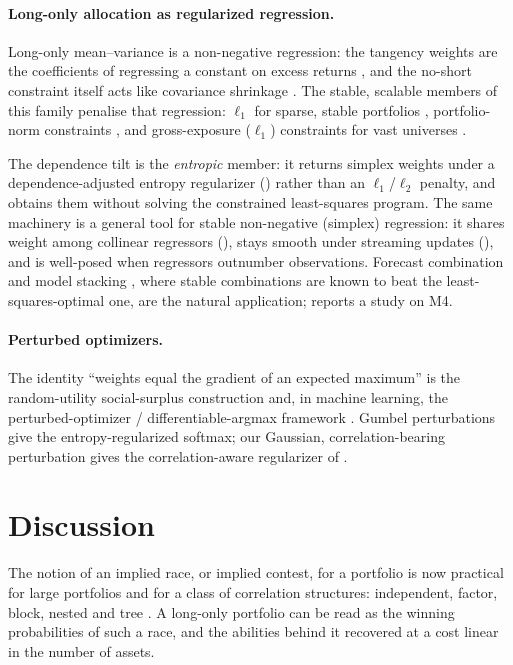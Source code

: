 \paragraph{Long-only allocation as regularized regression.}
Long-only mean--variance is a non-negative regression: the tangency weights are the
coefficients of regressing a constant on excess returns \parencite{brittenjones1999},
and the no-short constraint itself acts like covariance shrinkage
\parencite{jagannathanma2003}.
The stable, scalable members of this family penalise
that regression: $\ell_1$ for sparse, stable portfolios \parencite{brodie2009},
portfolio-norm constraints \parencite{demiguel2009norms}, and gross-exposure
($\ell_1$) constraints for vast universes \parencite{fan2012}.

The dependence tilt is
the \emph{entropic} member: it returns simplex weights under a dependence-adjusted
entropy regularizer () rather than an $\ell_1$/$\ell_2$ penalty,
and obtains them without solving the constrained least-squares program.
The same
machinery is a general tool for stable non-negative (simplex) regression: it shares
weight among collinear regressors (), stays smooth under
streaming updates (), and is well-posed when regressors outnumber
observations.
Forecast combination and model stacking \parencite{breiman1996,
timmermann2006}, where stable combinations are known to beat the
least-squares-optimal one, are the natural application; 
reports a study on M4.

\paragraph{Perturbed optimizers.}
The identity ``weights equal the gradient of an expected maximum'' is the
random-utility social-surplus construction \parencite{mcfadden1981, williams1977}
and, in machine learning, the perturbed-optimizer / differentiable-argmax
framework \parencite{berthet2020}. Gumbel perturbations give the
entropy-regularized softmax; our Gaussian, correlation-bearing perturbation gives
the correlation-aware regularizer of .

\section{Discussion}
\label{sec:discussion}

The notion of an implied race, or implied contest, for a portfolio is now practical
for large portfolios and for a class of correlation structures: independent,
factor, block, nested and tree \parencite{cotton2026inversion}. A long-only
portfolio can be read as the winning probabilities of such a race, and the
abilities behind it recovered at a cost linear in the number of assets.

